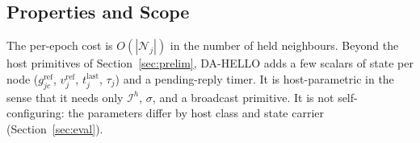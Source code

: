 \subsection{Properties and Scope}
\label{sec:scope}
The per-epoch cost is $O(|\mathcal{N}_j|)$ in the number of held neighbours. Beyond the host primitives of Section~\ref{sec:prelim}, DA-HELLO adds a few scalars of state per node ($g^{\mathrm{ref}}_{jc}$, $v^{\mathrm{ref}}_j$, $t^{\mathrm{last}}_j$, $\tau_j$) and a pending-reply timer. It is host-parametric in the sense that it needs only $\mathcal{I}^h$, $\sigma$, and a broadcast primitive. It is not self-configuring: the parameters differ by host class and state carrier (Section~\ref{sec:eval}).
